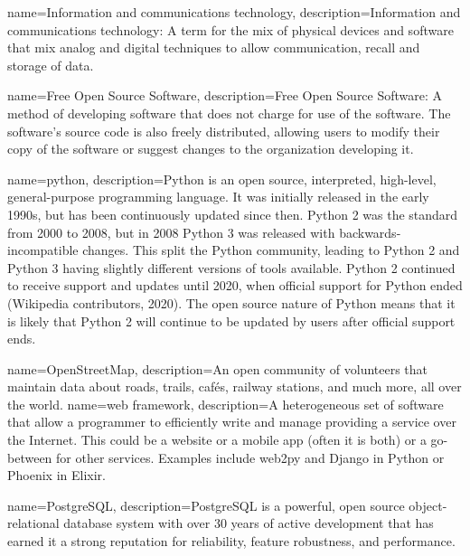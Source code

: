 

{
    name=Information and communications technology,
    description={Information and communications technology: A term for the mix of physical devices and software that mix analog and digital techniques to allow communication, recall and storage of data.}
}
 
{
    name=Free Open Source Software,
    description={Free Open Source Software: A method of developing software that does not charge for use of the software. The software's source code is also freely distributed, allowing users to modify their copy of the software or suggest changes to the organization developing it.}
}

{
    name=python,
    description={Python is an open source, interpreted, high-level, general-purpose programming language. It was initially released in the early 1990s, but has been continuously updated since then. Python 2 was the standard from 2000 to 2008, but in 2008 Python 3 was released with backwards-incompatible changes. This split the Python community, leading to Python 2 and Python 3 having slightly different versions of tools available. Python 2 continued to receive support and updates until 2020, when official support for Python ended (Wikipedia contributors, 2020). The open source nature of Python means that it is likely that Python 2 will continue to be updated by users after official support ends. }
}

{
    name=OpenStreetMap,
    description={An open community of volunteers that maintain data about roads, trails, cafés, railway stations, and much more, all over the world.}
}
{
    name=web framework,
    description={A heterogeneous set of software that allow a programmer to efficiently write and manage providing a service over the Internet. This could be a website or a mobile app (often it is both) or a go-between for other services. Examples include web2py and Django in Python or Phoenix in Elixir.}
}

{
   name=PostgreSQL,
   description={PostgreSQL is a powerful, open source object-relational database system with over 30 years of active development that has earned it a strong reputation for reliability, feature robustness, and performance.}
}

